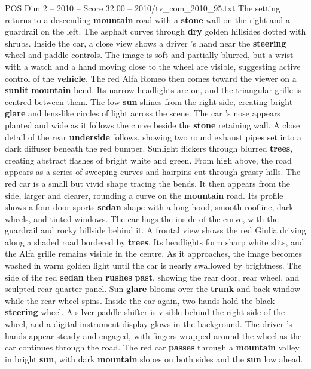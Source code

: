 \begin{textsample}{POS Dim 2 – 2010 – Score 32.00 – 2010/tv\_com\_2010\_95.txt}
The setting returns to a descending \textbf{mountain} road with a \textbf{stone} wall on the right and a guardrail on the left.
The asphalt curves through \textbf{dry} golden hillsides dotted with shrubs.
Inside the car, a close view shows a driver ’s hand near the \textbf{steering} wheel and paddle controls.
The image is soft and partially blurred, but a wrist with a watch and a hand moving close to the wheel are visible, suggesting active control of the \textbf{vehicle}.
The red Alfa Romeo then comes toward the viewer on a \textbf{sunlit} \textbf{mountain} bend.
Its narrow headlights are on, and the triangular grille is centred between them.
The low \textbf{sun} shines from the right side, creating bright \textbf{glare} and lens-like circles of light across the scene.
The car ’s nose appears planted and wide as it follows the curve beside the \textbf{stone} retaining wall.
A close detail of the rear \textbf{underside} follows, showing two round exhaust pipes set into a dark diffuser beneath the red bumper.
Sunlight flickers through blurred \textbf{trees}, creating abstract flashes of bright white and green.
From high above, the road appears as a series of sweeping curves and hairpins cut through grassy hills.
The red car is a small but vivid shape tracing the bends.
It then appears from the side, larger and clearer, rounding a curve on the \textbf{mountain} road.
Its profile shows a four-door sports \textbf{sedan} shape with a long hood, smooth roofline, dark wheels, and tinted windows.
The car hugs the inside of the curve, with the guardrail and rocky hillside behind it.
A frontal view shows the red Giulia driving along a shaded road bordered by \textbf{trees}.
Its headlights form sharp white slits, and the Alfa grille remains visible in the centre.
As it approaches, the image becomes washed in warm golden light until the car is nearly swallowed by brightness.
The side of the red \textbf{sedan} then \textbf{rushes} \textbf{past}, showing the rear door, rear wheel, and sculpted rear quarter panel.
Sun \textbf{glare} blooms over the \textbf{trunk} and back window while the rear wheel spins.
Inside the car again, two hands hold the black \textbf{steering} wheel.
A silver paddle shifter is visible behind the right side of the wheel, and a digital instrument display glows in the background.
The driver ’s hands appear steady and engaged, with fingers wrapped around the wheel as the car continues through the road.
The red car \textbf{passes} through a \textbf{mountain} valley in bright \textbf{sun}, with dark \textbf{mountain} slopes on both sides and the \textbf{sun} low ahead.

\end{textsample}
